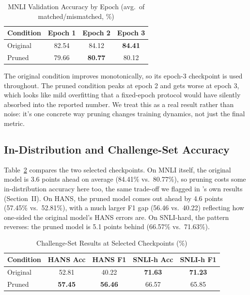 \documentclass[conference]{IEEEtran}
\begin{document}
\begin{table}[htbp]
\caption{MNLI Validation Accuracy by Epoch (avg.\ of matched/mismatched, \%)}
\label{tab:epochs}
\centering
\renewcommand{\arraystretch}{1.2}
\begin{tabular}{@{}lccc@{}}
\toprule
\textbf{Condition} & \textbf{Epoch 1} & \textbf{Epoch 2} & \textbf{Epoch 3} \\
\midrule
Original & 82.54 & 84.12 & \textbf{84.41} \\
Pruned   & 79.66 & \textbf{80.77} & 80.12 \\
\bottomrule
\end{tabular}
\end{table}

The original condition improves monotonically, so its epoch-3 checkpoint is used throughout. The pruned condition peaks at epoch 2 and gets worse at epoch 3, which looks like mild overfitting that a fixed-epoch protocol would have silently absorbed into the reported number. We treat this as a real result rather than noise: it's one concrete way pruning changes training dynamics, not just the final metric.

\subsection{In-Distribution and Challenge-Set Accuracy}

Table~\ref{tab:challenge} compares the two selected checkpoints. On MNLI itself, the original model is 3.6 points ahead on average (84.41\% vs.\ 80.77\%), so pruning costs some in-distribution accuracy here too, the same trade-off we flagged in \cite{wu2022generating}'s own results (Section~II). On HANS, the pruned model comes out ahead by 4.6 points (57.45\% vs.\ 52.81\%), with a much larger F1 gap (56.46 vs.\ 40.22) reflecting how one-sided the original model's HANS errors are. On SNLI-hard, the pattern reverses: the pruned model is 5.1 points behind (66.57\% vs.\ 71.63\%).

\begin{table}[htbp]
\caption{Challenge-Set Results at Selected Checkpoints (\%)}
\label{tab:challenge}
\centering
\renewcommand{\arraystretch}{1.2}
\setlength{\tabcolsep}{4pt}
\begin{tabular}{@{}lcccc@{}}
\toprule
\textbf{Condition} & \textbf{HANS Acc} & \textbf{HANS F1} & \textbf{SNLI-h Acc} & \textbf{SNLI-h F1} \\
\midrule
Original & 52.81 & 40.22 & \textbf{71.63} & \textbf{71.23} \\
Pruned   & \textbf{57.45} & \textbf{56.46} & 66.57 & 65.85 \\
\bottomrule
\end{tabular}
\end{table}
\end{document}

